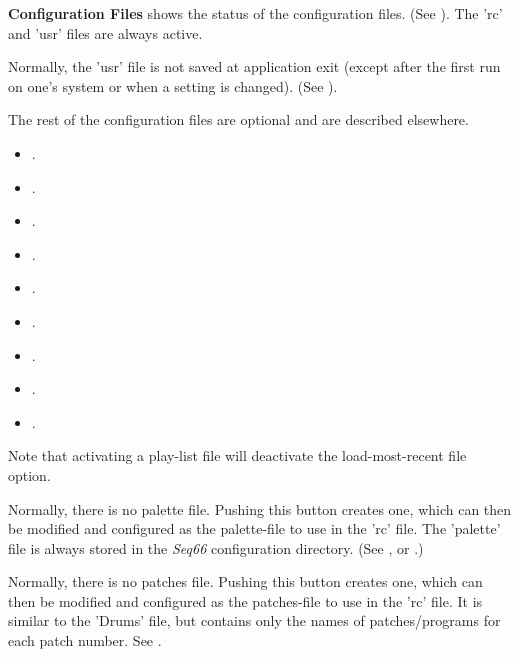    \textbf{Configuration Files}
   shows the status of the configuration files.
   (See ).
   The 'rc' and 'usr' files are always active.

   Normally, the 'usr' file is not saved at application exit
   (except after the first run on one's system or when a setting is changed).
   (See ).

   The rest of the configuration files are optional and are described
   elsewhere.

   \begin{itemize}
      \item {}.
      \item {}.
      \item {}.
      \item {}.
      \item {}.
      \item {}.
      \item {}.
      \item {}.
      \item {}.
   \end{itemize}

   Note that activating a play-list file will deactivate the
   load-most-recent file option.

   Normally, there is no palette file.  Pushing this button creates one, which
   can then be modified and configured as the palette-file to use in the 'rc'
   file.
   The 'palette' file is always
   stored in the \textsl{Seq66} configuration directory.
   (See , or
   .)

   Normally, there is no patches file.  Pushing this button creates one, which
   can then be modified and configured as the patches-file to use in the 'rc'
   file.
   It is similar to the 'Drums' file, but contains only the names of
   patches/programs for each patch number.
   See .

